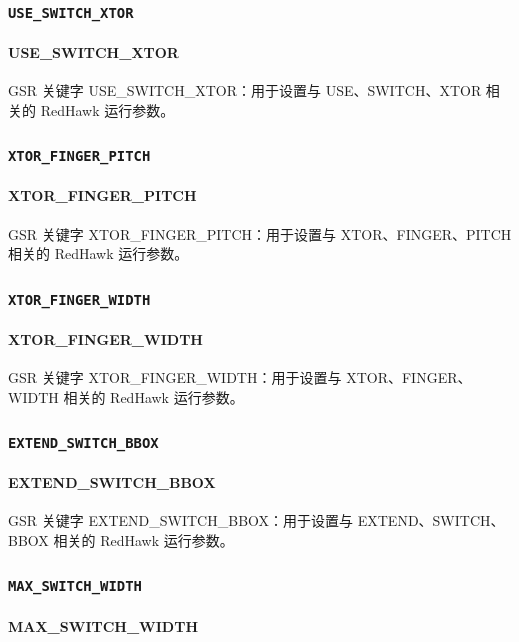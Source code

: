 \subsubsection{\texttt{USE_SWITCH_XTOR}}
\paragraph*{USE_SWITCH_XTOR}

GSR 关键字 USE_SWITCH_XTOR：用于设置与 USE、SWITCH、XTOR 相关的 RedHawk 运行参数。

\subsubsection{\texttt{XTOR_FINGER_PITCH}}
\paragraph*{XTOR_FINGER_PITCH}

GSR 关键字 XTOR_FINGER_PITCH：用于设置与 XTOR、FINGER、PITCH 相关的 RedHawk 运行参数。

\subsubsection{\texttt{XTOR_FINGER_WIDTH}}
\paragraph*{XTOR_FINGER_WIDTH}

GSR 关键字 XTOR_FINGER_WIDTH：用于设置与 XTOR、FINGER、WIDTH 相关的 RedHawk 运行参数。

\subsubsection{\texttt{EXTEND_SWITCH_BBOX}}
\paragraph*{EXTEND_SWITCH_BBOX}

GSR 关键字 EXTEND_SWITCH_BBOX：用于设置与 EXTEND、SWITCH、BBOX 相关的 RedHawk 运行参数。

\subsubsection{\texttt{MAX_SWITCH_WIDTH}}
\paragraph*{MAX_SWITCH_WIDTH}

